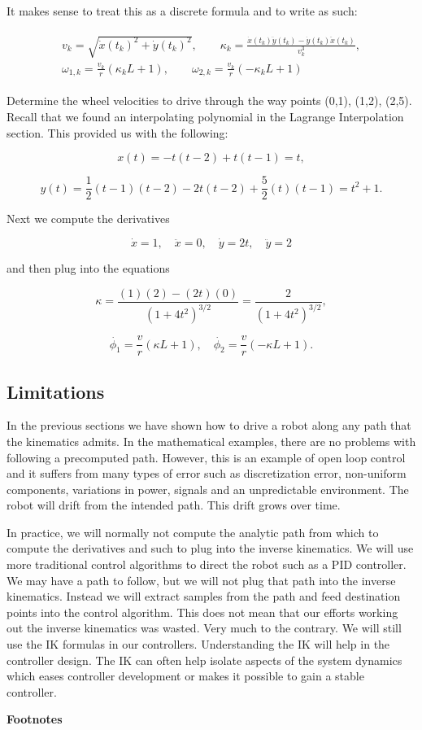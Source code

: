 It makes sense to treat this as a discrete formula and to write as such:

\[\begin{aligned}
\boxed{
\begin{array}{l}
v_k = \sqrt{\dot{x}(t_k)^2 + \dot{y}(t_k)^2} , \quad\quad
\displaystyle  \kappa_k = \frac{\dot{x}(t_k) \ddot{y}(t_k ) -  \dot{y}(t_k) \ddot{x}(t_k)}{v_k^3}, \\[3mm]
\displaystyle  \omega_{1,k} = \frac{v_k}{r}(\kappa_k L + 1), \quad\quad
\displaystyle  \omega_{2,k} = \frac{v_k}{r}(-\kappa_k L + 1)
\end{array} }
\end{aligned}\]

Determine the wheel velocities to drive through the way points (0,1),
(1,2), (2,5). Recall that we found an interpolating polynomial in the
Lagrange Interpolation section. This provided us with the following:

\[x(t) = -t(t-2) + t(t-1)  = t,\]

\[y(t) =  \frac{1}{2} (t-1)(t-2) - 2t(t-2) + \frac{5}{2} (t)(t-1)= t^2+1 .\]

Next we compute the derivatives

\[\dot{x} = 1,\quad \ddot{x} = 0,\quad \dot{y} = 2t,\quad \ddot{y} = 2\]

and then plug into the equations

\[\kappa = \frac{(1)(2) - (2t)(0)}{\left(1 + 4t^2\right)^{3/2}} = \frac{2}{\left(1 + 4t^2\right)^{3/2}} ,\]

\[\dot{\phi_1} =  \frac{v}{r}\left( \kappa L + 1\right) , \quad \dot{\phi_2} = \frac{v}{r}\left( - \kappa L  + 1\right).\]

\hypertarget{limitations}{%
\subsection{Limitations}\label{limitations}}

In the previous sections we have shown how to drive a robot along any
path that the kinematics admits. In the mathematical examples, there are
no problems with following a precomputed path. However, this is an
example of open loop control and it suffers from many types of error
such as discretization error, non-uniform components, variations in
power, signals and an unpredictable environment. The robot will drift
from the intended path. This drift grows over time.

In practice, we will normally not compute the analytic path from which
to compute the derivatives and such to plug into the inverse kinematics.
We will use more traditional control algorithms to direct the robot such
as a PID controller. We may have a path to follow, but we will not plug
that path into the inverse kinematics. Instead we will extract samples
from the path and feed destination points into the control algorithm.
This does not mean that our efforts working out the inverse kinematics
was wasted. Very much to the contrary. We will still use the IK formulas
in our controllers. Understanding the IK will help in the controller
design. The IK can often help isolate aspects of the system dynamics
which eases controller development or makes it possible to gain a stable
controller.

\textbf{Footnotes}
